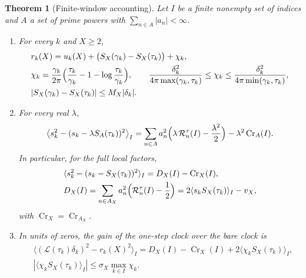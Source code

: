 \documentclass[preprint,12pt]{elsarticle}
\numberwithin{equation}{section}
\theoremstyle{plain}
\newtheorem{theorem}{Theorem}[section]
\theoremstyle{definition}
\theoremstyle{remark}
\newcommand{\lL}{\mathcal L}
\newcommand{\Cr}{\operatorname{Cr}}
\newcommand{\Rt}{\mathcal R^{\tau}}
\begin{document}
\begin{theorem}[Finite-window accounting]\label{thm:accounting}
Let $I$ be a finite nonempty set of indices and $A$ a set of prime powers with $\sum_{n\in A}|a_n|<\infty$.
\begin{enumerate}[label=(\alph*),leftmargin=2em]
\item For every $k$ and $X\ge2$,
\begin{equation}
\begin{split}
&r_k(X)=u_k(X)+\bigl(S_X(\gamma_k)-S_X(\tau_k)\bigr)+\chi_k,\\
&\chi_k=\frac{\gamma_k}{2\pi}\Bigl(\frac{\tau_k}{\gamma_k}-1-\log\frac{\tau_k}{\gamma_k}\Bigr),\qquad\frac{\delta_k^2}{4\pi\max(\gamma_k,\tau_k)}\le\chi_k\le\frac{\delta_k^2}{4\pi\min(\gamma_k,\tau_k)},\\
&|S_X(\gamma_k)-S_X(\tau_k)|\le M_X|\delta_k|.
\end{split}
\label{eq:one_step_decomposition}
\end{equation}
\item For every real $\lambda$,
\begin{equation}
\left\langle s_k^2-(s_k-\lambda S_A(\tau_k))^2\right\rangle_I
=\sum_{n\in A}a_n^2\Bigl(\lambda\,\Rt_n(I)-\frac{\lambda^2}{2}\Bigr)-\lambda^2\Cr_A(I).
\label{eq:exact_gain}
\end{equation}
In particular, for the full local factors,
\begin{equation}
\begin{split}
&\langle s_k^2-(s_k-S_X(\tau_k))^2\rangle_I=D_X(I)-\Cr_X(I),\\
&D_X(I)=\sum_{n\in A_X}a_n^2\Bigl(\Rt_n(I)-\frac12\Bigr)=2\langle s_kS_X(\tau_k)\rangle_I-v_X,
\end{split}
\label{eq:full_factor_gain}
\end{equation}
with $\Cr_X=\Cr_{A_X}$.
\item In units of zeros, the gain of the one-step clock over the bare clock is
\begin{equation}
\begin{split}
&\bigl\langle(\lL(\tau_k)\delta_k)^2-r_k(X)^2\bigr\rangle_I=D_X(I)-\Cr_X(I)+2\langle\chi_kS_X(\tau_k)\rangle_I,\\
&|\langle\chi_kS_X(\tau_k)\rangle_I|\le\sigma_X\max_{k\in I}\chi_k .
\end{split}
\label{eq:physical_gain}
\end{equation}
\end{enumerate}
\end{theorem}
\end{document}
